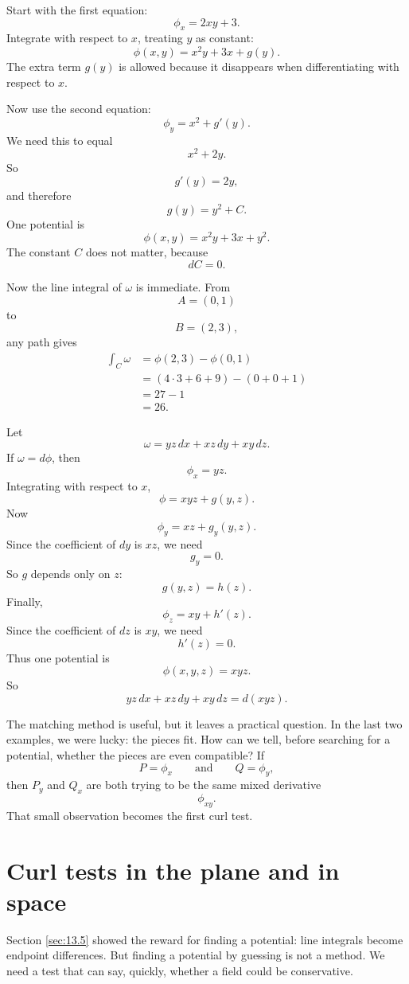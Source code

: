 Start with the first equation:
\[
    \phi_x=2xy+3.
\]
Integrate with respect to \(x\), treating \(y\) as constant:
\[
    \phi(x,y)=x^2y+3x+g(y).
\]
The extra term \(g(y)\) is allowed because it disappears when differentiating with
respect to \(x\).

Now use the second equation:
\[
    \phi_y=x^2+g'(y).
\]
We need this to equal
\[
    x^2+2y.
\]
So
\[
    g'(y)=2y,
\]
and therefore
\[
    g(y)=y^2+C.
\]
One potential is
\[
\boxed{
    \phi(x,y)=x^2y+3x+y^2.
}
\]
The constant \(C\) does not matter, because
\[
    dC=0.
\]

Now the line integral of \(\omega\) is immediate.  From
\[
    A=(0,1)
\]
to
\[
    B=(2,3),
\]
any path gives
\[
\begin{aligned}
\int_C \omega
&=
\phi(2,3)-\phi(0,1)\\
&=
(4\cdot3+6+9)-(0+0+1)\\
&=
27-1\\
&=
26.
\end{aligned}
\]

\begin{example}
Let
\[
    \omega=yz\,dx+xz\,dy+xy\,dz.
\]
If \(\omega=d\phi\), then
\[
    \phi_x=yz.
\]
Integrating with respect to \(x\),
\[
    \phi=xyz+g(y,z).
\]
Now
\[
    \phi_y=xz+g_y(y,z).
\]
Since the coefficient of \(dy\) is \(xz\), we need
\[
    g_y=0.
\]
So \(g\) depends only on \(z\):
\[
    g(y,z)=h(z).
\]
Finally,
\[
    \phi_z=xy+h'(z).
\]
Since the coefficient of \(dz\) is \(xy\), we need
\[
    h'(z)=0.
\]
Thus one potential is
\[
\boxed{
    \phi(x,y,z)=xyz.
}
\]
So
\[
    yz\,dx+xz\,dy+xy\,dz=d(xyz).
\]
\end{example}

The matching method is useful, but it leaves a practical question.  In the last two
examples, we were lucky: the pieces fit.  How can we tell, before searching for a
potential, whether the pieces are even compatible?  If
\[
    P=\phi_x
    \qquad\text{and}\qquad
    Q=\phi_y,
\]
then \(P_y\) and \(Q_x\) are both trying to be the same mixed derivative
\[
    \phi_{xy}.
\]
That small observation becomes the first curl test.

\section{Curl tests in the plane and in space}
\label{sec:13.6}

Section \ref{sec:13.5} showed the reward for finding a potential: line integrals become
endpoint differences.  But finding a potential by guessing is not a method.  We need a
test that can say, quickly, whether a field could be conservative.

